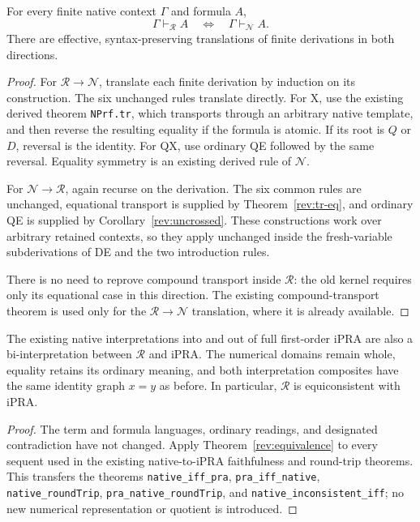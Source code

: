 \begin{theorem}
\label{rev:equivalence}
For every finite native context $\Gamma$ and formula $A$,
\[
                 \Gamma\vdash_{\mathcal R}A
                 \quad\Longleftrightarrow\quad
                 \Gamma\vdash_{\mathcal N}A.
\]
There are effective, syntax-preserving translations of finite
derivations in both directions.
\end{theorem}
\begin{proof}
For $\mathcal R\to\mathcal N$, translate each finite derivation by
induction on its construction. The six unchanged rules translate
directly. For X, use the existing derived theorem
\texttt{NPrf.tr}, which transports through an arbitrary native
template, and then reverse the resulting equality if the formula is
atomic. If its root is $Q$ or $D$, reversal is the identity. For QX,
use ordinary QE followed by the same reversal. Equality symmetry is an
existing derived rule of $\mathcal N$.

For $\mathcal N\to\mathcal R$, again recurse on the derivation. The
six common rules are unchanged, equational transport is supplied by
Theorem~\ref{rev:tr-eq}, and ordinary QE is supplied by
Corollary~\ref{rev:uncrossed}. These constructions work over arbitrary
retained contexts, so they apply unchanged inside the fresh-variable
subderivations of DE and the two introduction rules.

There is no need to reprove compound transport inside $\mathcal R$:
the old kernel requires only its equational case in this direction.
The existing compound-transport theorem is used only for the
$\mathcal R\to\mathcal N$ translation, where it is already available.
\end{proof}

\begin{corollary}
\label{rev:biinterpretation}
The existing native interpretations into and out of full first-order
iPRA are also a bi-interpretation between $\mathcal R$ and iPRA.
The numerical domains remain whole, equality retains its ordinary
meaning, and both interpretation composites have the same identity
graph $x=y$ as before. In particular, $\mathcal R$ is equiconsistent
with iPRA.
\end{corollary}
\begin{proof}
The term and formula languages, ordinary readings, and designated
contradiction have not changed. Apply
Theorem~\ref{rev:equivalence} to every sequent used in the existing
native-to-iPRA faithfulness and round-trip theorems. This transfers the
theorems \texttt{native\_iff\_pra}, \texttt{pra\_iff\_native},
\texttt{native\_roundTrip}, \texttt{pra\_native\_roundTrip}, and
\texttt{native\_inconsistent\_iff}; no new numerical representation
or quotient is introduced.
\end{proof}

